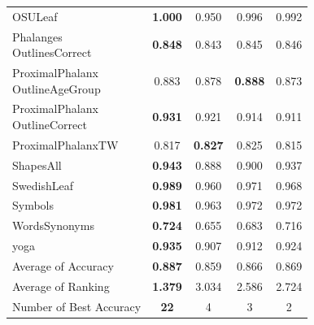 \documentclass[conference]{IEEEtran}
\begin{document}
\begin{table}[tb]
{\begin{tabular}{lcccc}
      OSULeaf & \textbf{1.000} & 0.950 & 0.996 & 0.992 \\
      \makecell[l]{Phalanges\\OutlinesCorrect} & \textbf{0.848} & 0.843 & 0.845 & 0.846 \\
      \makecell[l]{ProximalPhalanx\\OutlineAgeGroup} & 0.883 & 0.878 & \textbf{0.888} & 0.873 \\
      \makecell[l]{ProximalPhalanx\\OutlineCorrect} & \textbf{0.931} & 0.921 & 0.914 & 0.911 \\
      ProximalPhalanxTW & 0.817 & \textbf{0.827} & 0.825 & 0.815 \\
      ShapesAll & \textbf{0.943} & 0.888 & 0.900 & 0.937 \\
      SwedishLeaf & \textbf{0.989} & 0.960 & 0.971 & 0.968 \\
      Symbols & \textbf{0.981} & 0.963 & 0.972 & 0.972 \\
      WordsSynonyms & \textbf{0.724} & 0.655 & 0.683 & 0.716 \\
      yoga & \textbf{0.935} & 0.907 & 0.912 & 0.924 \\
      \midrule
      Average of Accuracy & \textbf{0.887} & 0.859 & 0.866 & 0.869 \\
      Average of Ranking & \textbf{1.379} & 3.034 & 2.586 & 2.724 \\
      Number of Best Accuracy & \textbf{22} & 4 & 3 & 2 \\
      \bottomrule
    \end{tabular}
  }
\end{table}
\end{document}
